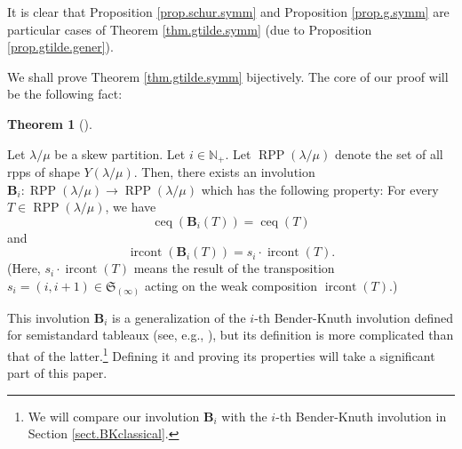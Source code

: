 \documentclass[numbers=enddot,12pt,final,onecolumn,notitlepage]{scrartcl}%
\theoremstyle{definition}
\newtheorem{theo}{Theorem}[section]
\newenvironment{theorem}[1][]
{\begin{theo}[#1]\begin{leftbar}}
{\end{leftbar}\end{theo}}
\begin{document}
It is clear that Proposition \ref{prop.schur.symm} and Proposition
\ref{prop.g.symm} are particular cases of Theorem \ref{thm.gtilde.symm} (due
to Proposition \ref{prop.gtilde.gener}).

We shall prove Theorem \ref{thm.gtilde.symm} bijectively. The core of our
proof will be the following fact:

\begin{theorem}
\label{thm.BK}Let $\lambda/\mu$ be a skew partition. Let $i\in\mathbb{N}_{+}$.
Let $\operatorname*{RPP}\left(  \lambda/\mu\right)  $ denote the set of all
rpps of shape $Y\left(  \lambda/\mu\right)  $. Then, there exists an
involution $\mathbf{B}_{i}:\operatorname*{RPP}\left(  \lambda/\mu\right)
\rightarrow\operatorname*{RPP}\left(  \lambda/\mu\right)  $ which has the
following property: For every $T\in\operatorname*{RPP}\left(  \lambda
/\mu\right)  $, we have%
\begin{equation}
\operatorname*{ceq}\left(  \mathbf{B}_{i}\left(  T\right)  \right)
=\operatorname*{ceq}\left(  T\right)  \label{eq.thm.BK.ceq}%
\end{equation}
and%
\begin{equation}
\operatorname*{ircont}\left(  \mathbf{B}_{i}\left(  T\right)  \right)
=s_{i}\cdot\operatorname*{ircont}\left(  T\right)  . \label{eq.thm.BK.ircont}%
\end{equation}
\footnotemark(Here, $s_{i}\cdot\operatorname*{ircont}\left(  T\right)  $ means
the result of the transposition $s_{i}=\left(  i,i+1\right)  \in
\mathfrak{S}_{\left(  \infty\right)  }$ acting on the weak composition
$\operatorname*{ircont}\left(  T\right)  $.)
\end{theorem}

This involution $\mathbf{B}_{i}$ is a generalization of the $i$-th
Bender-Knuth involution defined for semistandard tableaux (see, e.g.,
\cite[proof of Proposition 2.11]{GriRei15}), but its definition is more
complicated than that of the latter.\footnote{We will compare our involution
$\mathbf{B}_{i}$ with the $i$-th Bender-Knuth involution in Section
\ref{sect.BKclassical}.} Defining it and proving its properties will take a
significant part of this paper.
\end{document}
